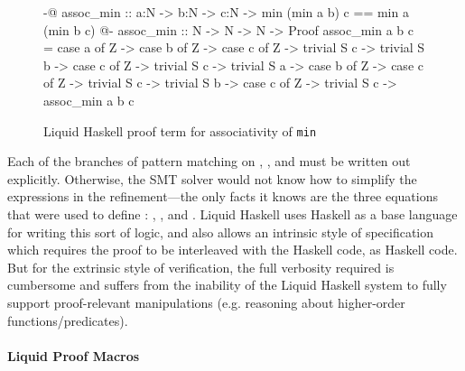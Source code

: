 \begin{figure}
\begin{code}
  {-@ assoc_min :: a:N -> b:N -> c:N ->
        {min (min a b) c == min a (min b c)} @-}
  assoc_min :: N -> N -> N -> Proof
  assoc_min a b c =
    case a of 
      Z ->
        case b of 
          Z ->
            case c of
              Z -> trivial
              S c -> trivial
          S b ->
            case c of
              Z -> trivial
              S c -> trivial
    S a ->
      case b of 
        Z ->
          case c of
            Z -> trivial
            S c -> trivial
        S b ->
          case c of
            Z -> trivial
            S c -> assoc_min a b c
\end{code}
\caption{Liquid Haskell proof term for associativity of \texttt{min}}
\label{fig:assoc-min-proof}
\end{figure}

Each of the branches of pattern matching on , , and 
must be written out explicitly. Otherwise, the SMT solver would not
know how to simplify the  expressions in the refinement---the
only facts it knows are the three equations that were used to define
: , , and
%
.
%
Liquid Haskell uses Haskell as a base language for
writing this sort of logic, and also allows an intrinsic style of
specification which requires the proof to be interleaved with the
Haskell code, as Haskell code.  But for the extrinsic style of
verification, the full verbosity required is cumbersome and suffers
from the inability of the Liquid Haskell system to fully support
proof-relevant manipulations (e.g. reasoning about higher-order
functions/predicates).

\paragraph*{Liquid Proof Macros}

